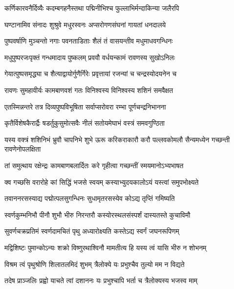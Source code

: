 \twolineshloka
{कर्णिकारवनैर्दिव्यैः कदम्बगहनैस्तथा}
{पद्मिनीभिश्च फुल्लाभिर्मन्दाकिन्या जलैरपि} %

\twolineshloka
{घण्टानामिव संनादः शुश्रुवे मधुरस्वनः}
{अप्सरोगणसंघनां गायतां धनदालये} %

\twolineshloka
{पुष्पवर्षाणि मुञ्चन्तो नगाः पवनताडिताः}
{शैलं तं वासयन्तीव मधुमाधवगन्धिनः} %

\twolineshloka
{मधुपुष्परजःपृक्तं गन्धमादाय पुष्कलम्}
{प्रववौ वर्धयन्कामं रावणस्य सुखोऽनिलः} %

\twolineshloka
{गेयात्पुष्पसमृद्ध्या च शैत्याद्वायोर्गुणैर्गिरेः}
{प्रवृत्तायां रजन्यां च चन्द्रस्योदयनेन च} %

\twolineshloka
{रावणः सुमहावीर्यः कामबाणवशं गतः}
{विनिश्वस्य विनिश्वस्य शशिनं समवैक्षत} %

\twolineshloka
{एतस्मिन्नन्तरे तत्र दिव्यपुष्पविभूषिता}
{सर्वाप्सरोवरा रम्भा पूर्णचन्द्रनिभानना} %

\twolineshloka
{कृतैर्विशेषकैरार्द्रैः षडर्तुकुसुमोत्सवैः}
{नीलं सतोयमेघाभं वस्त्रं समवगुण्ठिता} %

\threelineshloka
{यस्य वक्त्रं शशिनिभं भ्रुवौ चापनिभे शुभे}
{ऊरू करिकराकारौ करौ पल्लवकोमलौ}
{सैन्यमध्येन गच्छन्ती रावणेनोपलक्षिता} %

\twolineshloka
{तां समुत्थाय रक्षेन्द्रः कामबाणबलार्दितः}
{करे गृहीत्वा गच्छन्तीं स्मयमानोऽभ्यभाषत} %

\twolineshloka
{क्व गच्छसि वरारोहे कां सिद्धिं भजसे स्वयम्}
{कस्याभ्युदयकालोऽयं यस्त्वां समुपभोक्ष्यते} %

\twolineshloka
{तवाननरसस्याद्य पद्मोत्पलसुगन्धिनः}
{सुधामृतरसस्येव कोऽद्य तृप्तिं गमिष्यति} %

\twolineshloka
{स्वर्णकुम्भनिभौ पीनौ शुभौ भीरु निरन्तरौ}
{कस्योरस्थलसंस्पर्शं दास्यतस्ते कुचाविमौ} %

\twolineshloka
{सुवर्णचक्रप्रतिमं स्वर्णदामचितं पृथु}
{अध्यारोक्ष्यति कस्तेऽद्य स्वर्गं जघनरूपिणम्} %

\twolineshloka
{मद्विशिष्टः पुमान्कोऽन्यः शक्रो विष्णुरथाश्विनौ}
{मामतीत्य हि यस्य त्वं यासि भीरु न शोभनम्} %

\twolineshloka
{विश्रम त्वं पृथुश्रोणि शिलातलमिदं शुभम्}
{त्रैलोक्ये यः प्रभुश्चैव तुल्यो मम न विद्यते} %

\twolineshloka
{तदेष प्राञ्जलिः प्रह्वो याचते त्वां दशाननः}
{यः प्रभुश्चापि भर्ता च त्रैलोक्यस्य भजस्व माम्} %

